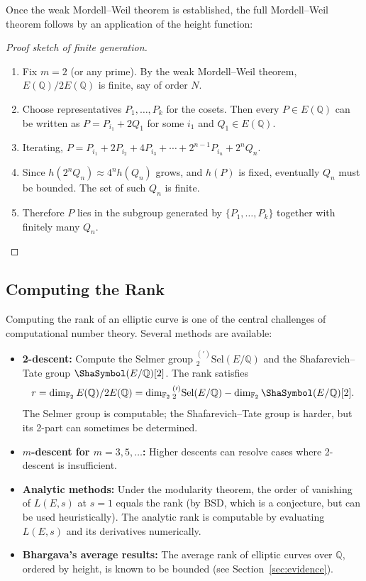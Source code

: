 Once the weak Mordell--Weil theorem is established, the full Mordell--Weil theorem follows by an application of the height function:

\begin{proof}[Proof sketch of finite generation]
\begin{enumerate}
\item Fix $m = 2$ (or any prime). By the weak Mordell--Weil theorem, $E(\mathbb{Q})/2E(\mathbb{Q})$ is finite, say of order $N$.
\item Choose representatives $P_1, \ldots, P_k$ for the cosets. Then every $P \in E(\mathbb{Q})$ can be written as $P = P_{i_1} + 2Q_1$ for some $i_1$ and $Q_1 \in E(\mathbb{Q})$.
\item Iterating, $P = P_{i_1} + 2P_{i_2} + 4P_{i_3} + \cdots + 2^{n-1} P_{i_n} + 2^n Q_n$.
\item Since $h(2^n Q_n) \approx 4^n h(Q_n)$ grows, and $h(P)$ is fixed, eventually $Q_n$ must be bounded. The set of such $Q_n$ is finite.
\item Therefore $P$ lies in the subgroup generated by $\{P_1, \ldots, P_k\}$ together with finitely many $Q_n$.
\end{enumerate}
\end{proof}

\subsection{Computing the Rank}

Computing the rank of an elliptic curve is one of the central challenges of computational number theory. Several methods are available:

\begin{itemize}
\item \textbf{2-descent:} Compute the Selmer group ${}^{(\prime)}_2\text{Sel}(E/\mathbb{Q})$ and the Shafarevich--Tate group $\Sha(E/\mathbb{Q})[2]$. The rank satisfies
\[
r = \dim_{\mathbb{F}_2} E(\mathbb{Q})/2E(\mathbb{Q}) = \dim_{\mathbb{F}_2} {}^{(\prime)}_2\text{Sel}(E/\mathbb{Q}) - \dim_{\mathbb{F}_2} \Sha(E/\mathbb{Q})[2].
\]
The Selmer group is computable; the Shafarevich--Tate group is harder, but its 2-part can sometimes be determined.
\item \textbf{$m$-descent for $m = 3, 5, \ldots$:} Higher descents can resolve cases where 2-descent is insufficient.
\item \textbf{Analytic methods:} Under the modularity theorem, the order of vanishing of $L(E, s)$ at $s = 1$ equals the rank (by BSD, which is a conjecture, but can be used heuristically). The analytic rank is computable by evaluating $L(E, s)$ and its derivatives numerically.
\item \textbf{Bhargava's average results:} The average rank of elliptic curves over $\mathbb{Q}$, ordered by height, is known to be bounded (see Section~\ref{sec:evidence}).
\end{itemize}

